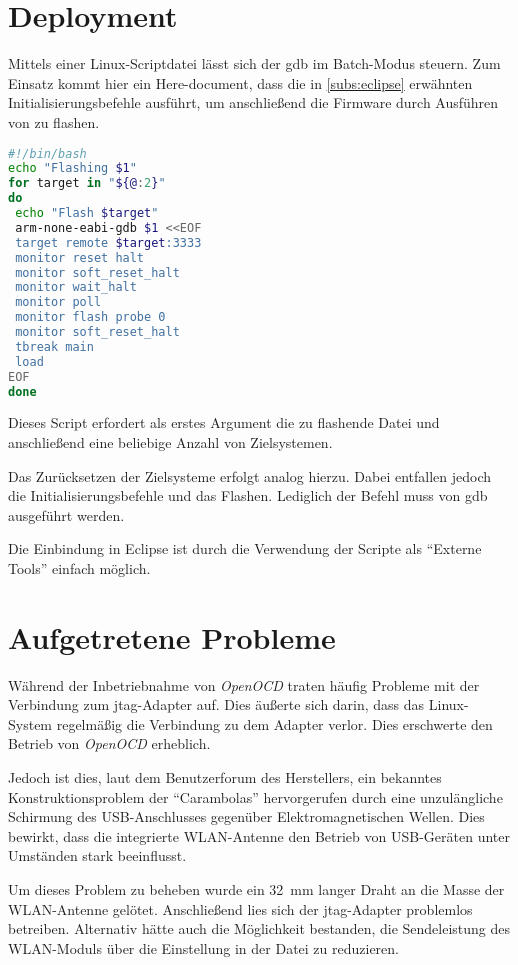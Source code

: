 \section{Deployment}\label{sect:deployment}
Mittels einer Linux-Scriptdatei lässt sich der \gls{gdb} im Batch-Modus steuern.
Zum Einsatz kommt hier ein Here-document, dass die in \autoref{subs:eclipse}
erwähnten Initialisierungsbefehle ausführt, um anschließend die Firmware durch
Ausführen von  zu flashen.
\begin{lstlisting}[language=sh]
#!/bin/bash
echo "Flashing $1"
for target in "${@:2}"
do
 echo "Flash $target"
 arm-none-eabi-gdb $1 <<EOF
 target remote $target:3333
 monitor reset halt
 monitor soft_reset_halt
 monitor wait_halt
 monitor poll
 monitor flash probe 0
 monitor soft_reset_halt
 tbreak main
 load
EOF
done
\end{lstlisting}
Dieses Script erfordert als erstes Argument die zu flashende Datei und
anschließend eine beliebige Anzahl von Zielsystemen.

Das Zurücksetzen der Zielsysteme erfolgt analog hierzu. Dabei entfallen jedoch
die Initialisierungsbefehle und das Flashen. Lediglich der Befehl
 muss von gdb ausgeführt werden.

Die Einbindung in Eclipse ist durch die Verwendung der Scripte als "`Externe
Tools"' einfach möglich.
\section{Aufgetretene Probleme}
Während der Inbetriebnahme von \emph{OpenOCD} traten häufig Probleme mit der
Verbindung zum \gls{jtag}-Adapter auf. Dies äußerte sich darin, dass das
Linux-System regelmäßig die Verbindung zu dem Adapter verlor. Dies
erschwerte den Betrieb von \emph{OpenOCD} erheblich.

Jedoch ist dies, laut dem Benutzerforum des Herstellers, ein bekanntes
Konstruktionsproblem der "`Carambolas"' hervorgerufen durch eine unzulängliche
Schirmung des USB-Anschlusses gegenüber Elektromagnetischen Wellen.
Dies bewirkt, dass die integrierte WLAN-Antenne den Betrieb von USB-Geräten
unter Umständen stark beeinflusst.

Um dieses Problem zu beheben wurde ein \SI{32}{\mm} langer Draht an die Masse
der WLAN-Antenne gelötet. Anschließend lies sich der \gls{jtag}-Adapter
problemlos betreiben. Alternativ hätte auch die Möglichkeit bestanden, die
Sendeleistung des WLAN-Moduls über die Einstellung 
in der Datei  zu reduzieren.
